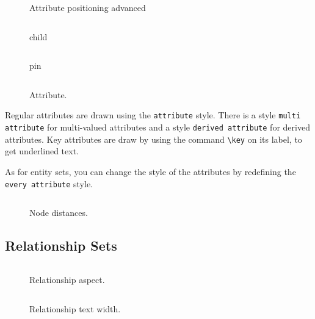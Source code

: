 \documentclass[12pt]{article}
\newcommand{\demo}[1]{
  \bigskip
  \begin{minipage}{\linewidth}
      \begin{center}
          
      \end{center}
      \begin{center}
          \scriptsize
          \inputminted{latex}{snippets/#1.tex}
      \end{center}
  \end{minipage}
}
\begin{document}
\begin{figure}[htb!]
    \centering
    \demo{attribute-positioning-advanced}
    \caption{Attribute positioning advanced}
\label{fig:attribute-positioning-advanced}
\end{figure}

\begin{figure}[htb!]
    \centering
    \demo{child}
    \caption{child}
\label{fig:child}
\end{figure}

\begin{figure}[htb!]
    \centering
    \demo{pin}
    \caption{pin}
\label{fig:pin}
\end{figure}

\begin{figure}[htb!]
    \centering
    \demo{attribute}
    \caption{Attribute.}
\label{fig:attribute}
\end{figure}

Regular attributes are drawn using the \texttt{attribute} style. There is a
style \texttt{multi attribute} for multi-valued attributes and a style
\texttt{derived attribute} for derived attributes. Key attributes are draw by
using the command \verb+\key+ on its label, to get underlined text.

As for entity sets, you can change the style of the attributes by redefining the
\texttt{every attribute} style.

\begin{figure}[htb!]
    \centering
    \demo{node-distances}
    \caption{Node distances.}
\label{fig:node-distances}
\end{figure}

%

\subsection{Relationship Sets}
\label{sec:relationships}

\begin{figure}[htb!]
    \centering
    \demo{relationship-aspect}
    \caption{Relationship aspect.}
\label{fig:relationship-aspect}
\end{figure}

\begin{figure}[htb!]
    \centering
    \demo{relationship-text-width}
    \caption{Relationship text width.}
\label{fig:relationship-text-width}
\end{figure}
\end{document}
